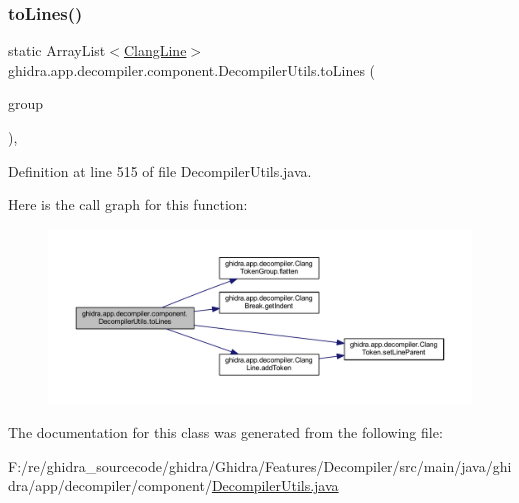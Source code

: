 \subsubsection{\texorpdfstring{toLines()}{toLines()}}
{\footnotesize\ttfamily static Array\+List$<$\mbox{\hyperlink{classghidra_1_1app_1_1decompiler_1_1_clang_line}{Clang\+Line}}$>$ ghidra.\+app.\+decompiler.\+component.\+Decompiler\+Utils.\+to\+Lines (\begin{DoxyParamCaption}\item[{\mbox{\hyperlink{classghidra_1_1app_1_1decompiler_1_1_clang_token_group}{Clang\+Token\+Group}}}]{group }\end{DoxyParamCaption})\hspace{0.3cm}{\ttfamily [inline]}, {\ttfamily [static]}}



Definition at line 515 of file Decompiler\+Utils.\+java.

Here is the call graph for this function\+:
\nopagebreak
\begin{figure}[H]
\begin{center}
\leavevmode
\includegraphics[width=350pt]{classghidra_1_1app_1_1decompiler_1_1component_1_1_decompiler_utils_ae4adb5edac8a860db65bc92ae0a4f9cd_cgraph}
\end{center}
\end{figure}


The documentation for this class was generated from the following file\+:\begin{DoxyCompactItemize}
\item 
F\+:/re/ghidra\+\_\+sourcecode/ghidra/\+Ghidra/\+Features/\+Decompiler/src/main/java/ghidra/app/decompiler/component/\mbox{\hyperlink{_decompiler_utils_8java}{Decompiler\+Utils.\+java}}\end{DoxyCompactItemize}
